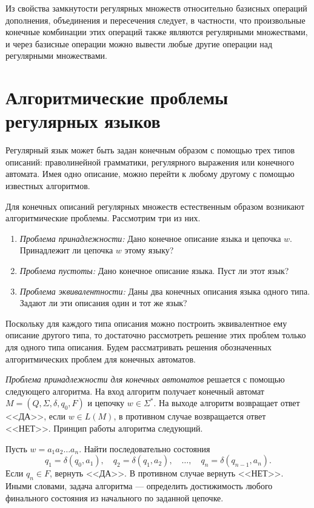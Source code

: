 Из свойства замкнутости регулярных множеств относительно базисных операций дополнения, объединения и пересечения следует, в частности, что произвольные конечные комбинации этих операций также являются регулярными множествами, и через базисные операции можно вывести любые другие операции над регулярными множествами.

\section{Алгоритмические проблемы регулярных языков}
\label{Chapter5AlgProblems}
Регулярный язык может быть задан конечным образом с помощью трех типов описаний: праволинейной грамматики, регулярного выражения или конечного автомата. Имея одно описание, можно перейти к любому другому с помощью известных алгоритмов.

Для конечных описаний регулярных множеств естественным образом возникают алгоритмические проблемы. Рассмотрим три из них.
\begin{enumerate}
\item \textit{Проблема принадлежности:} Дано конечное описание языка и цепочка $w$. Принадлежит ли цепочка $w$ этому языку?
\item \textit{Проблема пустоты:} Дано конечное описание языка. Пуст ли этот язык?
\item \textit{Проблема эквивалентности:} Даны два конечных описания языка одного типа. Задают ли эти описания один и тот же язык?
\end{enumerate}
Поскольку для каждого типа описания можно построить эквивалентное ему описание другого типа, то достаточно рассмотреть решение этих проблем только для одного типа описания. Будем рассматривать решения обозначенных алгоритмических проблем для конечных автоматов.

\textit{Проблема принадлежности для конечных автоматов} решается с 
помощью следующего алгоритма. На вход алгоритм получает конечный 
автомат $M = (Q,\Sigma, \delta, q_0, F)$ и цепочку $w \in \Sigma^*$. На 
выходе алгоритм возвращает ответ <<ДА>>, если $w \in L(M)$, в противном 
случае возвращается ответ <<НЕТ>>. Принцип работы алгоритма следующий.

Пусть $w = a_1a_2 \ldots a_n$. Найти последовательно состояния
\[q_1 = \delta(q_0, a_1), \quad q_2 = \delta(q_1, a_2), \quad\ldots ,\quad q_n = 
\delta(q_{n-1}, a_n).\] 
Если $q_n \in F$, вернуть <<ДА>>. В противном 
случае вернуть <<НЕТ>>. Иными словами, задача алгоритма --- определить 
достижимость любого финального состояния из начального по заданной 
цепочке.

